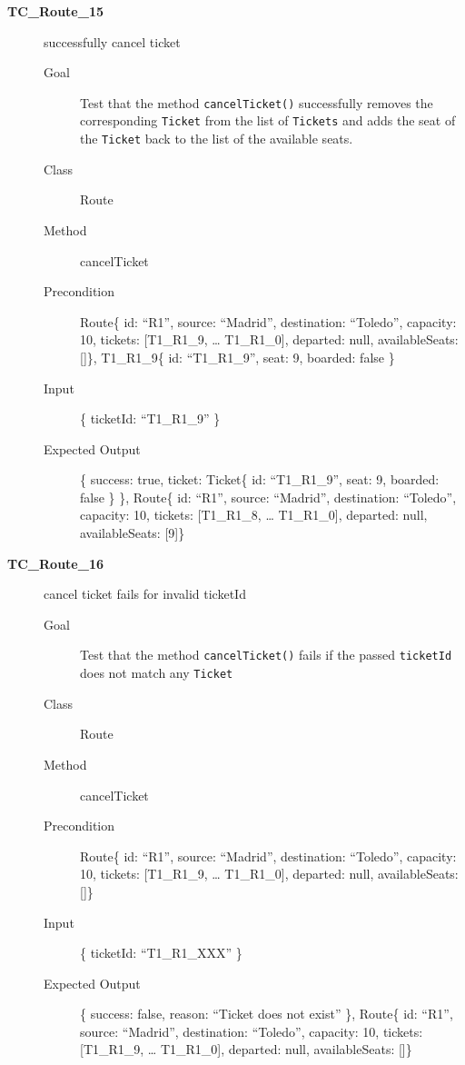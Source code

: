 \documentclass[11pt]{article}
\begin{document}
\begin{description}
\item[{\textbf{TC\_Route\_15}}] successfully cancel ticket
\begin{description}
\item[{Goal}] Test that the method \texttt{cancelTicket()} successfully removes the corresponding \texttt{Ticket} from the list of \texttt{Tickets} and adds the seat of the \texttt{Ticket} back to the list of the available seats.
\item[{Class}] Route
\item[{Method}] cancelTicket
\item[{Precondition}] Route\{ id: “R1”, source: “Madrid”, destination: “Toledo”, capacity: 10,  tickets: [T1\_R1\_9, … T1\_R1\_0], departed: null, availableSeats: []\}, T1\_R1\_9\{ id: “T1\_R1\_9”, seat: 9, boarded: false \}
\item[{Input}] \{ ticketId: “T1\_R1\_9” \}
\item[{Expected Output}] \{ success: true, ticket:  Ticket\{ id: “T1\_R1\_9”, seat: 9, boarded: false \} \},
Route\{ id: “R1”, source: “Madrid”, destination: “Toledo”, capacity: 10,  tickets: [T1\_R1\_8, … T1\_R1\_0], departed: null, availableSeats: [9]\}
\end{description}

\item[{\textbf{TC\_Route\_16}}] cancel ticket fails for invalid ticketId
\begin{description}
\item[{Goal}] Test that the method \texttt{cancelTicket()} fails if the passed \texttt{ticketId} does not match any \texttt{Ticket}
\item[{Class}] Route
\item[{Method}] cancelTicket
\item[{Precondition}] Route\{ id: “R1”, source: “Madrid”, destination: “Toledo”, capacity: 10,  tickets: [T1\_R1\_9, … T1\_R1\_0], departed: null, availableSeats: []\}
\item[{Input}] \{ ticketId: “T1\_R1\_XXX” \}
\item[{Expected Output}] \{ success: false, reason: “Ticket does not exist” \},
Route\{ id: “R1”, source: “Madrid”, destination: “Toledo”, capacity: 10,  tickets: [T1\_R1\_9, … T1\_R1\_0], departed: null, availableSeats: []\}
\end{description}


\end{description}
\end{document}

